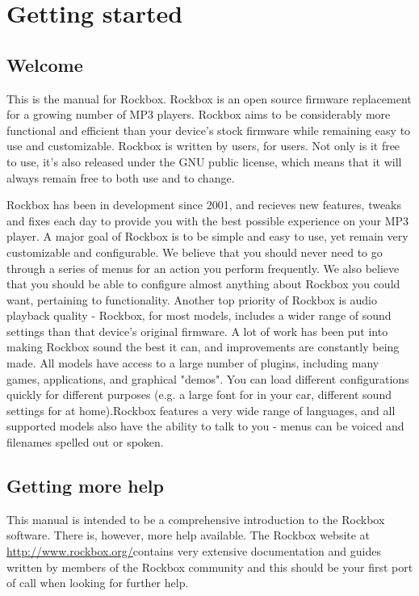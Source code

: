 \chapter{Getting started}
\section{Welcome}
This is the manual for Rockbox. Rockbox is an open source firmware replacement for a growing number of MP3 players. Rockbox aims to be considerably more functional and efficient than your device's stock firmware while remaining easy to use and customizable. Rockbox is written by users, for users. Not only is it free to use, it's also released under the GNU public license, which means that it will always remain free to both use and to change.

Rockbox has been in development since 2001, and recieves new features, tweaks and fixes each day to provide you with the best possible experience on your MP3 player. A major goal of Rockbox is to be simple and easy to use, yet remain very customizable and configurable. We believe that you should never need to go through a series of menus for an action you perform frequently. We also believe that you should be able to configure almost anything about Rockbox you could want, pertaining to functionality. Another top priority of Rockbox is audio playback quality - Rockbox, for most models, includes a wider range of sound settings than that device's original firmware. A lot of work has been put into making Rockbox sound the best it can, and improvements are constantly being made. All models have access to a large number of plugins, including many games, applications, and graphical "demos". You can load different configurations quickly for different purposes (e.g. a large font for in your car, different sound settings for at home).Rockbox features a very wide range of languages, and all supported models also have the ability to talk to you - menus can be voiced and filenames spelled out or spoken.

\section{Getting more help}
This manual is intended to be a comprehensive introduction to the Rockbox software.  There is, however, more help available.  The Rockbox website at \url{http://www.rockbox.org/}contains very extensive documentation and guides written by members of the Rockbox community and this should be your first port of call when looking for further help.

